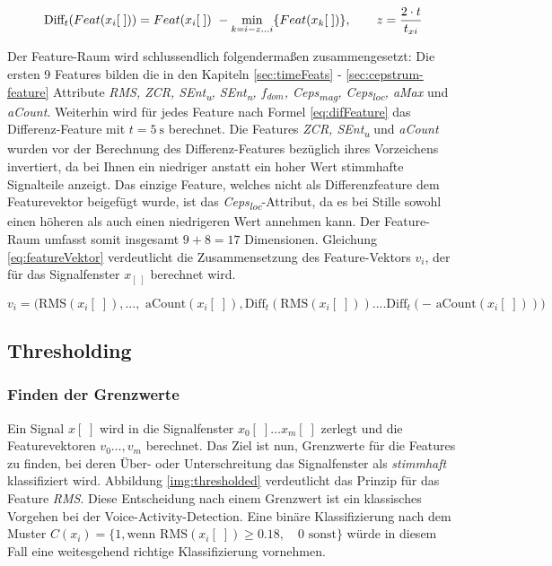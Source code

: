 \begin{equation}
\text{Diff}_t(Feat(x_i[\;])) = Feat(x_i[\;])\ - \operatorname*{min}_{k=i-z...i}\{Feat(x_k[\;])\}, \qquad z = \frac{2 \cdot t}{t_{xi}}
\label{eq:difFeature}
\end{equation}

Der Feature-Raum wird schlussendlich folgendermaßen zusammengesetzt: Die ersten 9 Features bilden die in den Kapiteln \ref{sec:timeFeats} - \ref{sec:cepstrum-feature} Attribute \emph{RMS, ZCR, SEnt\textsubscript{u}, SEnt\textsubscript{n}, $f_{dom}$, Ceps\textsubscript{mag}, Ceps\textsubscript{loc}, aMax} und \emph{aCount}. Weiterhin wird für jedes Feature nach Formel \ref{eq:difFeature} das Differenz-Feature mit $t = \SI{5}{\second}$ berechnet. Die Features \emph{ZCR, SEnt\textsubscript{u}} und \emph{aCount} wurden vor der Berechnung des Differenz-Features bezüglich ihres Vorzeichens invertiert, da bei Ihnen ein niedriger anstatt ein hoher Wert stimmhafte Signalteile anzeigt. Das einzige Feature, welches nicht als Differenzfeature dem Featurevektor beigefügt wurde, ist das \emph{Ceps\textsubscript{loc}}-Attribut, da es bei Stille sowohl einen höheren als auch einen niedrigeren Wert annehmen kann. Der Feature-Raum umfasst somit insgesamt $9 + 8 = 17 $ Dimensionen. Gleichung \ref{eq:featureVektor} verdeutlicht die Zusammensetzung des Feature-Vektors $v_i$, der für das Signalfenster $x_[\;]$ berechnet wird.

\begin{equation}
v_i = \Big( \text{RMS}(x_i[\;]), ...,\text{ aCount}(x_i[\;]), 
\text{Diff}_{t}(\text{RMS}(x_i[\;])) .... \text{Diff}_{t}(-\text{ aCount}(x_i[\;]))\Big)
\label{eq:featureVektor}
\end{equation}

\subsection{Thresholding}

\subsubsection{Finden der Grenzwerte}

Ein Signal $x[\;]$ wird in die Signalfenster $x_0[\;] \ldots x_m[\;]$ zerlegt und die Featurevektoren $v_0 \ldots , v_m$ berechnet. Das Ziel ist nun, Grenzwerte für die Features zu finden, bei deren Über- oder Unterschreitung das Signalfenster als \emph{stimmhaft} klassifiziert wird. Abbildung \ref{img:thresholded} verdeutlicht das Prinzip für das Feature \emph{RMS}. Diese Entscheidung nach einem Grenzwert ist ein klassisches Vorgehen bei der Voice-Activity-Detection. Eine binäre Klassifizierung nach dem Muster $C(x_i) = \{ 1, \text{wenn } \text{RMS}(x_i[\;]) \geq 0.18 ,\quad 0 \text{ sonst}\}$ würde in diesem Fall eine weitesgehend richtige Klassifizierung vornehmen.

